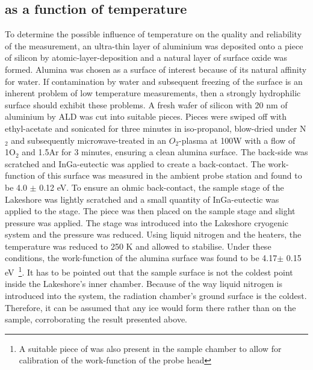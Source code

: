 \subsection{\cpd{} as a function of temperature}
To determine the possible influence of temperature on the quality and reliability of the measurement, an ultra-thin layer of aluminium was deposited onto a piece of silicon by atomic-layer-deposition and a natural layer of surface oxide was formed. Alumina was chosen as a surface of interest because of its natural affinity for water. If contamination by water and subsequent freezing of the surface is an inherent problem of low temperature \cpd{} measurements, then a strongly hydrophilic surface should exhibit these problems. A fresh wafer of silicon with 20 nm of aluminium by ALD was cut into suitable pieces. Pieces were swiped off with ethyl-acetate and sonicated for three minutes in iso-propanol, blow-dried under N$_2$ and subsequently microwave-treated in an $O_2$-plasma at 100W with a flow of 1\litmin O$_2$ and 1.5\litmin Ar for 3 minutes, ensuring a clean alumina surface. The back-side was scratched and InGa-eutectic was applied to create a back-contact. The work-function of this surface was measured in the ambient probe station and found to be 4.0 $\pm$ 0.12 eV. To ensure an ohmic back-contact, the sample stage of the Lakeshore was lightly scratched and a small quantity of InGa-eutectic was applied to the stage. The piece was then placed on the sample stage and slight pressure was applied. The stage was introduced into the Lakeshore cryogenic system and the pressure was reduced. Using liquid nitrogen and the heaters, the temperature was reduced to 250 K and allowed to stabilise. Under these conditions, the work-function of the alumina surface was found to be 4.17$\pm$ 0.15 eV~\footnote{A suitable piece of \hopg{} was also present in the sample chamber to allow for calibration of the work-function of the probe head}. It has to be pointed out that the sample surface is not the coldest point inside the Lakeshore's inner chamber. Because of the way liquid nitrogen is introduced into the system, the radiation chamber's ground surface is the coldest. Therefore, it can be assumed that any ice would form there rather than on the sample, corroborating the result presented above.
